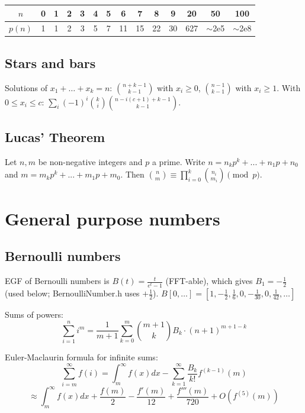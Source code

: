 		\begin{center}
		\begin{tabular}{c|c@{\ }c@{\ }c@{\ }c@{\ }c@{\ }c@{\ }c@{\ }c@{\ }c@{\ }c@{\ }c@{\ }c@{\ }c}
			$n$    & 0 & 1 & 2 & 3 & 4 & 5 & 6  & 7  & 8  & 9  & 20  & 50  & 100 \\ \hline
			$p(n)$ & 1 & 1 & 2 & 3 & 5 & 7 & 11 & 15 & 22 & 30 & 627 & $\mathtt{\sim}$2e5 & $\mathtt{\sim}$2e8 \\
		\end{tabular}
		\end{center}

	\subsection{Stars and bars}
		Solutions of $x_1 + \dots + x_k = n$: $\binom{n+k-1}{k-1}$ with $x_i \ge 0$, $\binom{n-1}{k-1}$ with $x_i \ge 1$.
		With $0 \le x_i \le c$: $\sum_{i} (-1)^i \binom{k}{i} \binom{n - i(c+1) + k - 1}{k - 1}$.

	\subsection{Lucas' Theorem}
		Let $n,m$ be non-negative integers and $p$ a prime. Write $n=n_kp^k+...+n_1p+n_0$ and $m=m_kp^k+...+m_1p+m_0$. Then $\binom{n}{m} \equiv \prod_{i=0}^k\binom{n_i}{m_i} \pmod{p}$.

\section{General purpose numbers}
	\subsection{Bernoulli numbers}
		EGF of Bernoulli numbers is $B(t)=\frac{t}{e^t-1}$ (FFT-able), which gives $B_1=-\frac12$ (used below; BernoulliNumber.h uses $+\frac12$).
		$B[0,\ldots] = [1, -\frac{1}{2}, \frac{1}{6}, 0, -\frac{1}{30}, 0, \frac{1}{42}, \ldots]$

		Sums of powers:
		\small
		\[ \sum_{i=1}^n i^m = \frac{1}{m+1} \sum_{k=0}^m \binom{m+1}{k} B_k \cdot (n+1)^{m+1-k} \]
		\normalsize

		Euler-Maclaurin formula for infinite sums:
		\small
		\[ \sum_{i=m}^{\infty} f(i) = \int_m^\infty f(x) dx - \sum_{k=1}^\infty \frac{B_k}{k!}f^{(k-1)}(m) \]
		\[ \approx \int_{m}^\infty f(x)dx + \frac{f(m)}{2} - \frac{f'(m)}{12} + \frac{f'''(m)}{720} + O(f^{(5)}(m)) \]
		\normalsize

